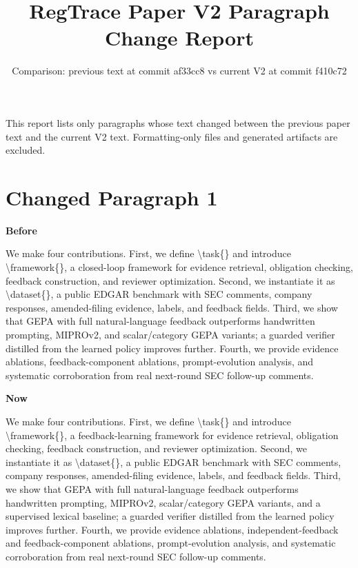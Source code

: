 \documentclass[11pt]{article}
\title{RegTrace Paper V2 Paragraph Change Report}
\author{}
\date{Comparison: previous text at commit af33cc8 vs current V2 at commit f410c72}
\newenvironment{beforebox}{\def\FrameCommand{\fboxsep=7pt\colorbox{beforegray}}\MakeFramed{\advance\hsize-2\width\FrameRestore}\small}{\endMakeFramed}
\newenvironment{nowbox}{\def\FrameCommand{\fboxsep=7pt\colorbox{nowblue}}\MakeFramed{\advance\hsize-2\width\FrameRestore}\small}{\endMakeFramed}
\begin{document}
\maketitle
\noindent This report lists only paragraphs whose text changed between the previous paper text and the current V2 text. Formatting-only files and generated artifacts are excluded.


\section*{Changed Paragraph 1}

\noindent\textbf{Before}

\begin{beforebox}
We make four contributions. First, we define \textbackslash{}task\{\} and introduce \textbackslash{}framework\{\}, a closed-loop framework for evidence retrieval, obligation checking, feedback construction, and reviewer optimization. Second, we instantiate it as \textbackslash{}dataset\{\}, a public EDGAR benchmark with SEC comments, company responses, amended-filing evidence, labels, and feedback fields. Third, we show that GEPA with full natural-language feedback outperforms handwritten prompting, MIPROv2, and scalar/category GEPA variants; a guarded verifier distilled from the learned policy improves further. Fourth, we provide evidence ablations, feedback-component ablations, prompt-evolution analysis, and systematic corroboration from real next-round SEC follow-up comments.
\end{beforebox}

\noindent\textbf{Now}

\begin{nowbox}
We make four contributions. First, we define \textbackslash{}task\{\} and introduce \textbackslash{}framework\{\}, a feedback-learning framework for evidence retrieval, obligation checking, feedback construction, and reviewer optimization. Second, we instantiate it as \textbackslash{}dataset\{\}, a public EDGAR benchmark with SEC comments, company responses, amended-filing evidence, labels, and feedback fields. Third, we show that GEPA with full natural-language feedback outperforms handwritten prompting, MIPROv2, scalar/category GEPA variants, and a supervised lexical baseline; a guarded verifier distilled from the learned policy improves further. Fourth, we provide evidence ablations, independent-feedback and feedback-component ablations, prompt-evolution analysis, and systematic corroboration from real next-round SEC follow-up comments.
\end{nowbox}
\end{document}
